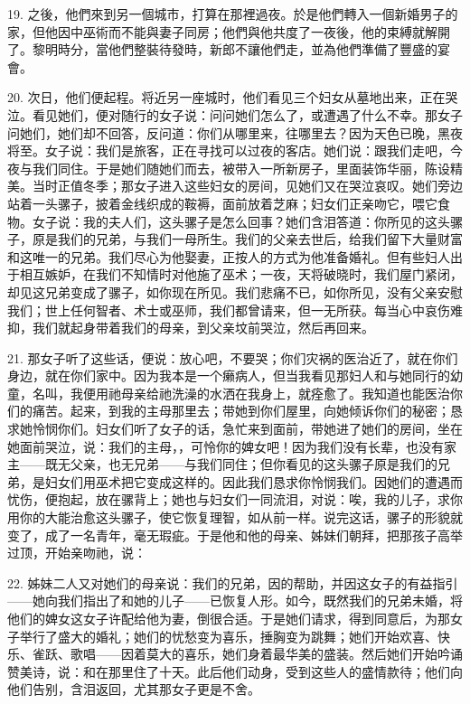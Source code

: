 19. 之後，他們來到另一個城市，打算在那裡過夜。於是他們轉入一個新婚男子的家，但他因中巫術而不能與妻子同房；他們與他共度了一夜後，他的束縛就解開了。黎明時分，當他們整裝待發時，新郎不讓他們走，並為他們準備了豐盛的宴會。\par

20. 次日，他们便起程。将近另一座城时，他们看见三个妇女从墓地出来，正在哭泣。看见她们，便对随行的女子说：问问她们怎么了，或遭遇了什么不幸。那女子问她们，她们却不回答，反问道：你们从哪里来，往哪里去？因为天色已晚，黑夜将至。女子说：我们是旅客，正在寻找可以过夜的客店。她们说：跟我们走吧，今夜与我们同住。于是她们随她们而去，被带入一所新房子，里面装饰华丽，陈设精美。当时正值冬季；那女子进入这些妇女的房间，见她们又在哭泣哀叹。她们旁边站着一头骡子，披着金线织成的鞍褥，面前放着芝麻；妇女们正亲吻它，喂它食物。女子说：我的夫人们，这头骡子是怎么回事？她们含泪答道：你所见的这头骡子，原是我们的兄弟，与我们一母所生。我们的父亲去世后，给我们留下大量财富和这唯一的兄弟。我们尽心为他娶妻，正按人的方式为他准备婚礼。但有些妇人出于相互嫉妒，在我们不知情时对他施了巫术；一夜，天将破晓时，我们屋门紧闭，却见这兄弟变成了骡子，如你现在所见。我们悲痛不已，如你所见，没有父亲安慰我们；世上任何智者、术士或巫师，我们都曾请来，但一无所获。每当心中哀伤难抑，我们就起身带着我们的母亲，到父亲坟前哭泣，然后再回来。\par

21. 那女子听了这些话，便说：放心吧，不要哭；你们灾祸的医治近了，就在你们身边，就在你们家中。因为我本是一个癞病人，但当我看见那妇人和与她同行的幼童，名叫，我便用祂母亲给祂洗澡的水洒在我身上，就痊愈了。我知道也能医治你们的痛苦。起来，到我的主母那里去；带她到你们屋里，向她倾诉你们的秘密；恳求她怜悯你们。妇女们听了女子的话，急忙来到面前，带她进了她们的房间，坐在她面前哭泣，说：我们的主母，，可怜你的婢女吧！因为我们没有长辈，也没有家主——既无父亲，也无兄弟——与我们同住；但你看见的这头骡子原是我们的兄弟，是妇女们用巫术把它变成这样的。因此我们恳求你怜悯我们。因她们的遭遇而忧伤，便抱起，放在骡背上；她也与妇女们一同流泪，对说：唉，我的儿子，求你用你的大能治愈这头骡子，使它恢复理智，如从前一样。说完这话，骡子的形貌就变了，成了一名青年，毫无瑕疵。于是他和他的母亲、姊妹们朝拜，把那孩子高举过顶，开始亲吻祂，说：\par

22. 姊妹二人又对她们的母亲说：我们的兄弟，因的帮助，并因这女子的有益指引——她向我们指出了和她的儿子——已恢复人形。如今，既然我们的兄弟未婚，将他们的婢女这女子许配给他为妻，倒很合适。于是她们请求，得到同意后，为那女子举行了盛大的婚礼；她们的忧愁变为喜乐，捶胸变为跳舞；她们开始欢喜、快乐、雀跃、歌唱——因着莫大的喜乐，她们身着最华美的盛装。然后她们开始吟诵赞美诗，说：和在那里住了十天。此后他们动身，受到这些人的盛情款待；他们向他们告别，含泪返回，尤其那女子更是不舍。\par

